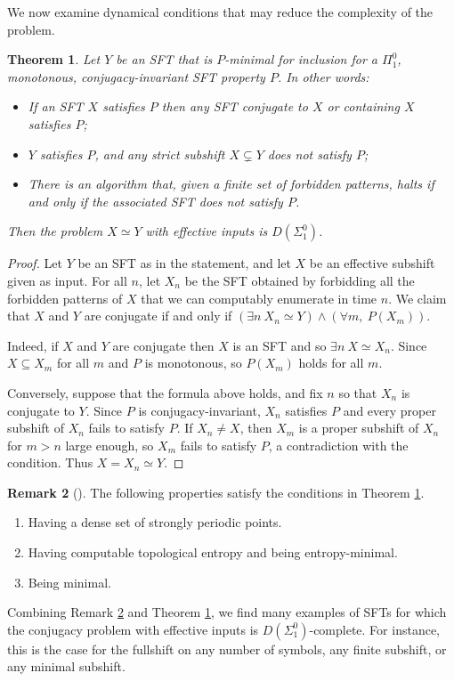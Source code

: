 \documentclass[a4paper]{article}
\newtheorem{theorem}{Theorem}[section]
\theoremstyle{definition}
\newtheorem{remark}[theorem]{Remark}
\begin{document}
We now examine dynamical conditions that may reduce the complexity of the problem. 
\begin{theorem} \label{abstract-complexity-of-conjugacy}
Let $Y$ be an SFT that is $P$-minimal for inclusion for a $\Pi^0_1$, monotonous, conjugacy-invariant SFT property $P$. In other words:
\begin{itemize}
\item If an SFT $X$ satisfies $P$ then any SFT conjugate to $X$ or containing $X$ satisfies $P$;
    \item $Y$ satisfies $P$, and any strict subshift $X \subsetneq Y$ does not satisfy $P$;
    \item There is an algorithm that, given a finite set of forbidden patterns, halts if and only if the associated SFT does not satisfy $P$.
\end{itemize}
Then the problem $X\simeq Y$ with effective inputs is $D(\Sigma_1^0)$.
\end{theorem}
\begin{proof}
Let $Y$ be an SFT as in the statement, and let $X$ be an effective subshift given as input. For all $n$, let $X_n$ be the SFT obtained by forbidding all the forbidden patterns of $X$ that we can computably enumerate in time $n$. We claim that $X$ and $Y$ are conjugate if and only if $(\exists n \ X_n \simeq Y) \land (\forall m, \ P(X_m))$.

Indeed, if $X$ and $Y$ are conjugate then $X$ is an SFT and so $\exists n \ X \simeq X_n$. Since $X\subseteq X_m$ for all $m$ and $P$ is monotonous, so $P(X_m)$ holds for all $m$.

Conversely, suppose that the formula above holds, and fix $n$ so that $X_n$ is conjugate to $Y$. Since $P$ is conjugacy-invariant, $X_n$ satisfies $P$ and every proper subshift of $X_n$ fails to satisfy $P$. If $X_n \neq X$, then $X_m$ is a proper subshift of $X_n$ for $m>n$ large enough, so $X_m$ fails to satisfy $P$, a contradiction with the condition. Thus $X = X_n \simeq Y$.
\end{proof}
\begin{remark}[\cite{amir_minimality_2025}]\label{conjfullsheasy}
    The following properties satisfy the conditions in Theorem \ref{abstract-complexity-of-conjugacy}.
    \begin{enumerate}
        \item Having a dense set of strongly periodic points. 
        \item Having computable topological entropy and being entropy-minimal. 
        \item Being minimal.
    \end{enumerate}
\end{remark}
Combining Remark \ref{conjfullsheasy} and Theorem \ref{abstract-complexity-of-conjugacy}, we find many examples of SFTs for which the conjugacy problem with effective inputs is $D(\Sigma_1^0)$-complete. For instance, this is the case for the fullshift on any number of symbols, any finite subshift, or any minimal subshift. 
\end{document}
